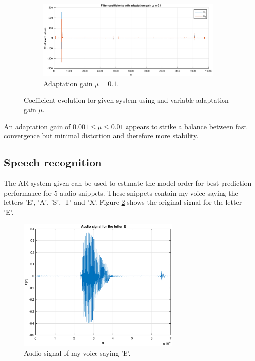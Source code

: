 \begin{figure}[H]
\begin{subfigure}{.45\textwidth}
  \centering
  \includegraphics[width=\linewidth]{assignment4figs/armu01.eps}  
  \caption{Adaptation gain $\mu = 0.1$.}
\end{subfigure}
\caption{Coefficient evolution for given system using  and variable adaptation gain $\mu$.}
\label{fig:mu2}
\end{figure}

\noindent
An adaptation gain of $0.001 \leq \mu \leq 0.01$ appears to strike a balance between fast convergence but minimal distortion and therefore more stability.

\subsection{Speech recognition}

The AR system given can be used to estimate the model order for best prediction performance for 5 audio snippets. These snippets contain my voice saying the letters 'E', 'A', 'S', 'T' and 'X'. Figure \ref{fig:letter_e} shows the original signal for the letter 'E'.

\begin{figure}[H]
    \centering
    \includegraphics[width=8cm]{assignment4figs/e.eps}
    \caption{Audio signal of my voice saying 'E'.}
    \label{fig:letter_e}
\end{figure}

